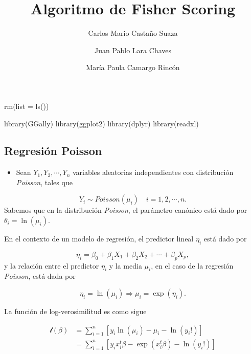 \documentclass[
  letterpaper,
  DIV=11,
  numbers=noendperiod]{scrartcl}
\title{Algoritmo de Fisher Scoring}
\author{Carlos Mario Castaño Suaza \and Juan Pablo Lara
Chaves \and María Paula Camargo Rincón}
\date{}
\newenvironment{Shaded}{\begin{snugshade}}{\end{snugshade}}
\newcommand{\AttributeTok}[1]{\textcolor[rgb]{0.40,0.45,0.13}{#1}}
\newcommand{\FunctionTok}[1]{\textcolor[rgb]{0.28,0.35,0.67}{#1}}
\newcommand{\NormalTok}[1]{\textcolor[rgb]{0.00,0.23,0.31}{#1}}
\providecommand{\tightlist}{%
  \setlength{\itemsep}{0pt}\setlength{\parskip}{0pt}}\usepackage{longtable,booktabs,array}
\begin{document}
\maketitle


\begin{Shaded}
\begin{Highlighting}[]
\FunctionTok{rm}\NormalTok{(}\AttributeTok{list =} \FunctionTok{ls}\NormalTok{())}
\end{Highlighting}
\end{Shaded}

\begin{Shaded}
\begin{Highlighting}[]
\FunctionTok{library}\NormalTok{(GGally)}
\FunctionTok{library}\NormalTok{(ggplot2)}
\FunctionTok{library}\NormalTok{(dplyr)}
\FunctionTok{library}\NormalTok{(readxl)}
\end{Highlighting}
\end{Shaded}

\subsection{Regresión Poisson}\label{regresiuxf3n-poisson}

\begin{itemize}
\tightlist
\item
  Sean \(Y_1, Y_2, \cdots, Y_n\) variables aleatorias independientes con
  distribución \emph{Poisson}, tales que
\end{itemize}

\[Y_i \sim Poisson(\mu_i) \quad i=1,2,\cdots,n.\] Sabemos que en la
distribución \emph{Poisson}, el parámetro canónico está dado por
\(\theta_i = \ln(\mu_i)\).

En el contexto de un modelo de regresión, el predictor lineal \(\eta_i\)
está dado por

\[\eta_i = \beta_0 + \beta_1X_1 + \beta_2X_2 + \cdots + \beta_pX_p,\] y
la relación entre el predictor \(\eta_i\) y la media \(\mu_i\), en el
caso de la regresión \emph{Poisson}, está dada por

\[\eta_i = \ln(\mu_i) \Rightarrow \mu_i = \exp(\eta_i).\]

La función de log-verosimilitud es como sigue

\[
\begin{align*}
\mathcal{l}(\beta) &= \sum_{i=1}^n \left[y_i\ln(\mu_i) - \mu_i - \ln(y_i!)\right]\\
&= \sum_{i=1}^n \left[y_i x_i^t \beta - \exp(x_i^t \beta) - \ln(y_i!)\right]
\end{align*}
\]
\end{document}

